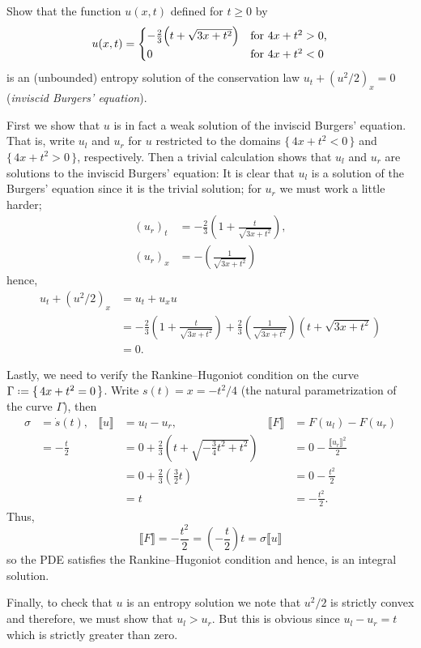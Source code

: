 \begin{problem}
  Show that the function \(u(x,t)\) defined for \(t\geq 0\) by
  \[
    u(x,t)=
    \begin{cases}
      -\tfrac{2}{3}\Bigl(t+\sqrt{3x+t^2}\Bigr)
      &\text{for \(4x+t^2>0\),}\\
      0
      &\text{for \(4x+t^2<0\)}
    \end{cases}
  \]
  is an (unbounded) entropy solution of the conservation law
  \(u_t+(u^2/2)_x=0\) (\emph{inviscid Burgers' equation}).
\end{problem}
\begin{solution*}
  First we show that \(u\) is in fact a weak solution of the inviscid
  Burgers' equation. That is, write \(u_l\) and \(u_r\) for \(u\)
  restricted to the domains \(\{\,4x+t^2<0\,\}\) and \(\{\,4x+t^2>0\,\}\),
  respectively. Then a trivial calculation shows that \(u_l\) and \(u_r\)
  are solutions to the inviscid Burgers' equation: It is clear that \(u_l\)
  is a solution of the Burgers' equation since it is the trivial solution;
  for \(u_r\) we must work a little harder;
  \begin{align*}
    {(u_r)}_t&=-\frac{2}{3}\left(1+\frac{t}{\sqrt{3x+t^2}}\right),\\
    {(u_r)}_x&=-\left(\frac{1}{\sqrt{3x+t^2}}\right)
  \end{align*}
  hence,
  \begin{align*}
    u_t+(u^2/2)_x
    &=u_t+u_xu\\
    &=-\frac{2}{3}\left(1+\frac{t}{\sqrt{3x+t^2}}\right)
      +\frac{2}{3}
      \left(\frac{1}{\sqrt{3x+t^2}}\right)\left(t+\sqrt{3x+t^2}\right)\\
    &=0.
  \end{align*}

  Lastly, we need to verify the Rankine--Hugoniot condition on the curve
  \(\Gamma\defeq \{\,4x+t^2=0\,\}\). Write \(s(t)=x=-t^2/4\) (the natural
  parametrization of the curve \(\Gamma\)), then
  \begin{align*}
    \sigma&=\dot s(t),
    &\llbracket u\rrbracket
    &=u_l-u_r,
    &\llbracket F\rrbracket
    &=F(u_l)-F(u_r)\\
          &=-\frac{t}{2}
    &&=0+\frac{2}{3}\left(t+\sqrt{-\tfrac{3}{4}t^2+t^2}\right)
    &&=0-\frac{\llbracket u_r\rrbracket^2}{2}\\
          &&
    &=0+\frac{2}{3}\left(\frac{3}{2}t\right)
    &&=0-\frac{t^2}{2}
    \\
          &&&=t&&=-\frac{t^2}{2}.
  \end{align*}
  Thus,
  \[
    \llbracket
    F\rrbracket=-\frac{t^2}{2}=\left(-\frac{t}{2}\right)t=\sigma\llbracket
    u\rrbracket
  \]
  so the PDE satisfies the Rankine--Hugoniot condition and hence, is an
  integral solution.

  Finally, to check that \(u\) is an entropy solution we note that
  \(u^2/2\) is strictly convex and therefore, we must show that
  \(u_l>u_r\). But this is obvious since \(u_l-u_r=t\) which is strictly
  greater than zero.
\end{solution*}

